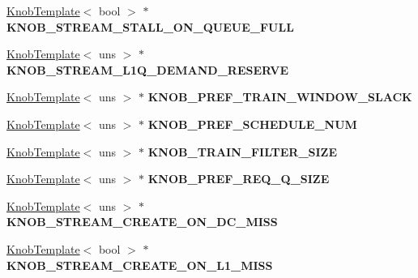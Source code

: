\begin{DoxyCompactItemize}
\item 
\hypertarget{classall__knobs__c_a7d86188870980e131df1b25ccd930b30}{
\hyperlink{classKnobTemplate}{KnobTemplate}$<$ bool $>$ $\ast$ {\bfseries KNOB\_\-STREAM\_\-STALL\_\-ON\_\-QUEUE\_\-FULL}}
\label{classall__knobs__c_a7d86188870980e131df1b25ccd930b30}

\item 
\hypertarget{classall__knobs__c_aeba9b25f0fe2fcdb9b1ee96d5a81c863}{
\hyperlink{classKnobTemplate}{KnobTemplate}$<$ uns $>$ $\ast$ {\bfseries KNOB\_\-STREAM\_\-L1Q\_\-DEMAND\_\-RESERVE}}
\label{classall__knobs__c_aeba9b25f0fe2fcdb9b1ee96d5a81c863}

\item 
\hypertarget{classall__knobs__c_a9f0408d35a70d4de54c0a36645254d56}{
\hyperlink{classKnobTemplate}{KnobTemplate}$<$ uns $>$ $\ast$ {\bfseries KNOB\_\-PREF\_\-TRAIN\_\-WINDOW\_\-SLACK}}
\label{classall__knobs__c_a9f0408d35a70d4de54c0a36645254d56}

\item 
\hypertarget{classall__knobs__c_ad8f170050c6a7732cd20942d899f1b5c}{
\hyperlink{classKnobTemplate}{KnobTemplate}$<$ uns $>$ $\ast$ {\bfseries KNOB\_\-PREF\_\-SCHEDULE\_\-NUM}}
\label{classall__knobs__c_ad8f170050c6a7732cd20942d899f1b5c}

\item 
\hypertarget{classall__knobs__c_a1ec5ef6745c38c18af8aa7748b9e90b9}{
\hyperlink{classKnobTemplate}{KnobTemplate}$<$ uns $>$ $\ast$ {\bfseries KNOB\_\-TRAIN\_\-FILTER\_\-SIZE}}
\label{classall__knobs__c_a1ec5ef6745c38c18af8aa7748b9e90b9}

\item 
\hypertarget{classall__knobs__c_adf9b36ef4279830a28a2c7678672310b}{
\hyperlink{classKnobTemplate}{KnobTemplate}$<$ uns $>$ $\ast$ {\bfseries KNOB\_\-PREF\_\-REQ\_\-Q\_\-SIZE}}
\label{classall__knobs__c_adf9b36ef4279830a28a2c7678672310b}

\item 
\hypertarget{classall__knobs__c_a2f40d9ee497dfe5570d17de71817b7ad}{
\hyperlink{classKnobTemplate}{KnobTemplate}$<$ uns $>$ $\ast$ {\bfseries KNOB\_\-STREAM\_\-CREATE\_\-ON\_\-DC\_\-MISS}}
\label{classall__knobs__c_a2f40d9ee497dfe5570d17de71817b7ad}

\item 
\hypertarget{classall__knobs__c_a3bf6af4d73d948760f9255d084b80eba}{
\hyperlink{classKnobTemplate}{KnobTemplate}$<$ bool $>$ $\ast$ {\bfseries KNOB\_\-STREAM\_\-CREATE\_\-ON\_\-L1\_\-MISS}}
\label{classall__knobs__c_a3bf6af4d73d948760f9255d084b80eba}


\end{DoxyCompactItemize}

